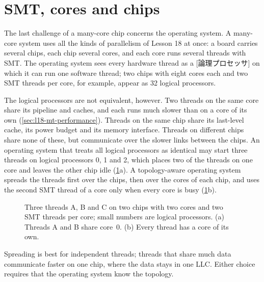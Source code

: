 \documentclass[../main.tex]{subfiles}
\begin{document}
\section{SMT, cores and chips}
\label{sec:l22-os}

The last challenge of a many-core chip concerns the operating
system.  A many-core system uses all the kinds of parallelism of Lesson 18
at once: a board carries several chips, each chip several cores, and each
core runs several threads with SMT.  The operating system sees every
hardware thread as a [論理プロセッサ] on which it
can run one software thread; two chips with eight cores each and two SMT
threads per core, for example, appear as 32 logical
processors.

The logical processors are not equivalent, however.  Two threads on the same
core share its pipeline and caches, and each runs much slower than on a core
of its own (\cref{sec:l18-mt-performance}).  Threads on the same chip share
its last-level cache, its power budget and its memory interface.  Threads on
different chips share none of these, but communicate over the slower links
between the chips.  An operating system that treats all logical processors
as identical may start three threads on logical processors 0, 1 and 2,
which places two of the threads on one core and leaves the other chip idle
(\cref{fig:l22-placement}a).  A topology-aware operating system spreads the
threads first over the chips, then over the cores of each chip, and uses the
second SMT thread of a core only when every core is busy
(\cref{fig:l22-placement}b).

\begin{figure}[htbp]
  \centering
  
  \caption{Three threads A, B and C on two chips with two cores and two SMT
    threads per core; small numbers are logical processors.  (a) Threads A
    and B share core~0.  (b) Every thread has a core of its own.}
  \label{fig:l22-placement}
\end{figure}

\begin{note}
  Spreading is best for independent threads; threads that share much data
  communicate faster on one chip, where the data stays in one LLC.  Either
  choice requires that the operating system know the topology.
\end{note}
\end{document}
